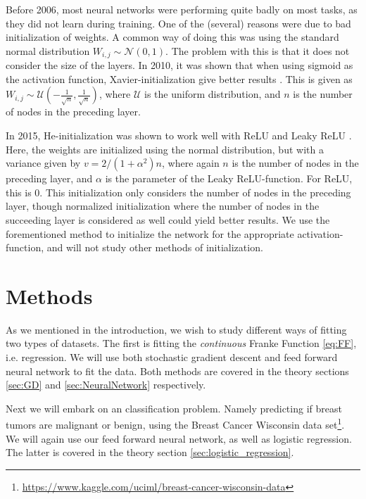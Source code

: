 \documentclass[12pt]{extarticle}
\begin{document}
Before 2006, most neural networks were performing quite badly on most tasks, as they did not learn during training. One of the (several) reasons were due to bad initialization of weights. A common way of doing this was using the standard normal distribution $W_{i,j} \sim  \mathcal{N}(0, 1)$. The problem with this is that it does not consider the size of the layers. In 2010, it was shown that when using sigmoid as the activation function, Xavier-initialization give better results \cite{xavier}. This is given as $W_{i, j}\sim\mathcal{U} \left(-\frac{1}{\sqrt{n}}, \frac{1}{\sqrt{n}} \right)$, where $\mathcal{U}$ is the uniform distribution, and $n$ is the number of nodes in the preceding layer.

In 2015, He-initialization was shown to work well with ReLU and Leaky ReLU \cite{He}. Here, the weights are initialized using the normal distribution, but with a variance given by $v = 2/(1 + \alpha^2)n$, where again $n$ is the number of nodes in the preceding layer, and $\alpha$ is the parameter of the Leaky ReLU-function. For ReLU, this is 0. This initialization only considers the number of nodes in the preceding layer, though normalized initialization where the number of nodes in the succeeding layer is considered as well could yield better results. We use the forementioned method to initialize the network for the appropriate activation-function, and will not study other methods of initialization.



\section{Methods}
As we mentioned in the introduction, we wish to study different ways of fitting two types of datasets. The first is fitting the \textit{continuous} Franke Function \eqref{eq:FF}, i.e. regression. We will use both stochastic gradient descent and feed forward neural network to fit the data. Both methods are covered in the theory sections \ref{sec:GD} and \ref{sec:NeuralNetwork} respectively.

Next we will embark on an classification problem. Namely predicting if breast tumors are malignant or benign, using the Breast Cancer Wisconsin data set\footnote{\href{https://www.kaggle.com/uciml/breast-cancer-wisconsin-data}{https://www.kaggle.com/uciml/breast-cancer-wisconsin-data}}. We will again use our feed forward neural network, as well as logistic regression. The latter is covered in the theory section \ref{sec:logistic_regression}.
\end{document}
